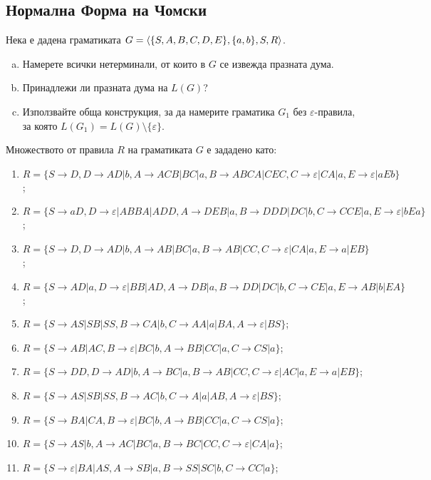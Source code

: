 \subsection{Нормална Форма на Чомски}

\begin{problem}
  Нека е дадена граматиката  $G = \langle{\{S,A,B,C,D,E\}, \{a,b\},S, R}\rangle$.
  \begin{enumerate}[a)]
  \item
    Намерете всички нетерминали, от които в $G$ се извежда празната дума.
  \item
    Принадлежи ли празната дума на $L(G)$?
  \item
    Използвайте обща конструкция, за да намерите граматика $G_1$ без $\varepsilon$-правила, за която $L(G_1)=L(G)\setminus\{\varepsilon\}$.
  \end{enumerate}
  Множеството от правила $R$ на граматиката $G$ е зададено като:
  \begin{enumerate}
  \item
    $R = \{S\rightarrow D,D\rightarrow AD|b,A\rightarrow ACB|BC|a, B\rightarrow ABCA|CEC,C\rightarrow \varepsilon|CA|a, E\rightarrow \varepsilon|aEb\}$;
  \item
    $R = \{S \rightarrow aD, D\rightarrow \varepsilon|ABBA|ADD,A\rightarrow DEB|a,B\rightarrow DDD|DC|b,C\rightarrow CCE|a, E\rightarrow \varepsilon|bEa\}$;
  \item
    $R = \{ S\rightarrow D,D\rightarrow AD|b,A\rightarrow AB|BC|a, B\rightarrow AB|CC, C\rightarrow \varepsilon|CA|a, E\rightarrow a|EB\}$;
  \item
    $R = \{ S \rightarrow AD|a, D\rightarrow \varepsilon|BB|AD,A\rightarrow DB|a,B\rightarrow DD|DC|b,C\rightarrow CE|a, E\rightarrow AB|b|EA\}$;
  \item
    $R =\{S\rightarrow AS|SB|SS,B\rightarrow CA|b, C\rightarrow AA|a|BA,A\rightarrow \varepsilon|BS\}$;
  \item
    $R = \{S\rightarrow AB|AC,B\rightarrow \varepsilon |BC|b,A\rightarrow BB|CC|a,C\rightarrow CS|a\}$;
  \item
    $R=\{S\rightarrow DD,D\rightarrow AD|b,A\rightarrow BC|a,B\rightarrow AB|CC, C\rightarrow \varepsilon|AC|a, E\rightarrow a|EB\}$;
  \item
    $R = \{S\rightarrow AS|SB|SS,B\rightarrow AC|b, C\rightarrow A|a|AB,A\rightarrow \varepsilon|BS\}$;
  \item
    $R = \{S\rightarrow BA|CA,B\rightarrow \varepsilon |BC|b,A\rightarrow BB|CC|a,
    C\rightarrow CS|a\}$;
  \item
    $R = \{S\rightarrow AS|b,A\rightarrow AC|BC|a, B\rightarrow BC|CC,C\rightarrow \varepsilon|CA|a\}$;
  \item
    $R = \{S\rightarrow \varepsilon|BA|AS,A\rightarrow SB|a,B\rightarrow SS|SC|b,
    C\rightarrow CC|a\}$; 
  \end{enumerate}
\end{problem}

